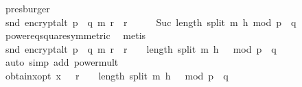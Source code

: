 \begin{isabellebody}
\ presburger\isanewline
\ \ \isamarkupfalse%
\ \isamarkupfalse%
\ {\isachardoublequoteopen}snd\ {\isacharparenleft}{\kern0pt}encrypt{\isacharunderscore}{\kern0pt}alt\ {\isacharparenleft}{\kern0pt}p\ {\isacharasterisk}{\kern0pt}\ q{\isacharparenright}{\kern0pt}\ m\ r{\isacharparenright}{\kern0pt}\ {\isacharequal}{\kern0pt}\ {\isacharparenleft}{\kern0pt}r\ {\isacharcircum}{\kern0pt}\ {}{\isacharparenright}{\kern0pt}\ {\isacharcircum}{\kern0pt}\ {\isacharparenleft}{\kern0pt}{}\ {\isacharcircum}{\kern0pt}\ {\isacharparenleft}{\kern0pt}Suc\ {\isacharparenleft}{\kern0pt}length\ {\isacharparenleft}{\kern0pt}split\ m\ h{\isacharparenright}{\kern0pt}{\isacharparenright}{\kern0pt}{\isacharparenright}{\kern0pt}{\isacharparenright}{\kern0pt}\ mod\ {\isacharparenleft}{\kern0pt}p\ {\isacharasterisk}{\kern0pt}\ q{\isacharparenright}{\kern0pt}{\isachardoublequoteclose}\ \isanewline
\ \ \ \ \isamarkupfalse%
\ power{}{\isacharunderscore}{\kern0pt}eq{\isacharunderscore}{\kern0pt}square{\isacharbrackleft}{\kern0pt}symmetric{\isacharbrackright}{\kern0pt}\ \isamarkupfalse%
\ metis\isanewline
\ \ \isamarkupfalse%
\ \isamarkupfalse%
\ {\isachardoublequoteopen}snd\ {\isacharparenleft}{\kern0pt}encrypt{\isacharunderscore}{\kern0pt}alt\ {\isacharparenleft}{\kern0pt}p\ {\isacharasterisk}{\kern0pt}\ q{\isacharparenright}{\kern0pt}\ m\ r{\isacharparenright}{\kern0pt}\ {\isacharequal}{\kern0pt}\ r\ {\isacharcircum}{\kern0pt}\ {\isacharparenleft}{\kern0pt}{}\ {\isacharcircum}{\kern0pt}\ {\isacharparenleft}{\kern0pt}{\isacharparenleft}{\kern0pt}length\ {\isacharparenleft}{\kern0pt}split\ m\ h{\isacharparenright}{\kern0pt}{\isacharparenright}{\kern0pt}\ {\isacharplus}{\kern0pt}\ {}{\isacharparenright}{\kern0pt}{\isacharparenright}{\kern0pt}\ mod\ {\isacharparenleft}{\kern0pt}p\ {\isacharasterisk}{\kern0pt}\ q{\isacharparenright}{\kern0pt}{\isachardoublequoteclose}\isanewline
\ \ \ \ \isamarkupfalse%
\ {\isacharparenleft}{\kern0pt}auto\ simp\ add{\isacharcolon}{\kern0pt}\ power{\isacharunderscore}{\kern0pt}mult{\isacharparenright}{\kern0pt}\isanewline
\ \ \isamarkupfalse%
\ \isamarkupfalse%
\ obtain{\isacharunderscore}{\kern0pt}x{\isacharunderscore}{\kern0pt}opt{}{\isacharcolon}{\kern0pt}\ {\isachardoublequoteopen}x\ {\isacharequal}{\kern0pt}\ \ r\ {\isacharcircum}{\kern0pt}\ {\isacharparenleft}{\kern0pt}{}\ {\isacharcircum}{\kern0pt}\ {\isacharparenleft}{\kern0pt}{\isacharparenleft}{\kern0pt}length\ {\isacharparenleft}{\kern0pt}split\ m\ h{\isacharparenright}{\kern0pt}{\isacharparenright}{\kern0pt}\ {\isacharplus}{\kern0pt}\ {}{\isacharparenright}{\kern0pt}{\isacharparenright}{\kern0pt}\ mod\ {\isacharparenleft}{\kern0pt}p\ {\isacharasterisk}{\kern0pt}\ q{\isacharparenright}{\kern0pt}{\isachardoublequoteclose}\ \isanewline

\end{isabellebody}

